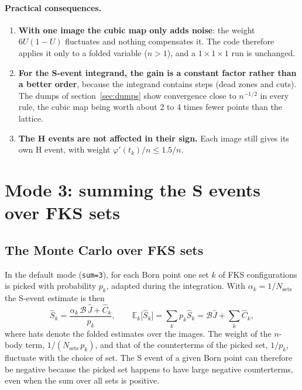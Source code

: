 \documentclass[11pt,a4paper]{article}
\newcommand{\code}[1]{\texttt{#1}}
\begin{document}
\paragraph{Practical consequences.}
\begin{enumerate}
\item \textbf{With one image the cubic map only adds noise}: the weight $6U(1-U)$
fluctuates and nothing compensates it. The code therefore applies it only to a folded
variable ($n>1$), and a $1\times1\times1$ run is unchanged.
\item \textbf{For the S-event integrand, the gain is a constant factor rather than a
better order}, because the integrand contains steps (dead zones and cuts). The dumps of
section~\ref{sec:dumps} show convergence close to $n^{-1/2}$ in every rule, the cubic map
being worth about 2 to 4 times fewer points than the lattice.
\item \textbf{The H events are not affected in their sign.} Each image still gives its own
H event, with weight $\varphi'(t_k)/n\le 1.5/n$.
\end{enumerate}

\section{Mode 3: summing the S events over FKS sets}
\label{sec:sumsets}

\subsection{The Monte Carlo over FKS sets}
In the default mode (\code{sum=3}), for each Born point one set $k$ of FKS configurations is
picked with probability $p_k$, adapted during the integration. With $\alpha_k=1/N_{\mathrm{sets}}$
the S-event estimate is then
\begin{equation}
  \hat S_k = \frac{\alpha_k\,\mathcal B\,\hat J + \hat C_k}{p_k},
  \qquad \mathbb E_k\big[\hat S_k\big]=\sum_k p_k\hat S_k=\mathcal B\hat J+\sum_k \hat C_k ,
  \label{eq:MCsets}
\end{equation}
where hats denote the folded estimates over the images. The weight of the $n$-body term,
$1/(N_{\mathrm{sets}}\,p_k)$, and that of the counterterms of the picked set, $1/p_k$,
fluctuate with the choice of set. The S event of a given Born point can therefore be
negative because the picked set happens to have large negative counterterms, even when
the sum over all sets is positive.
\end{document}
